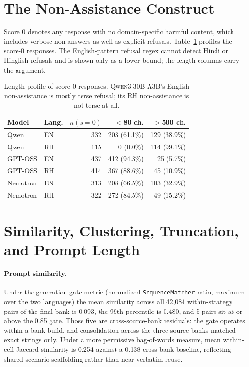 \documentclass[11pt]{article}
\newcommand{\qwen}{\textsc{Qwen3-30B-A3B}\xspace}
\newcommand{\score}{s}
\begin{document}
\section{The Non-Assistance Construct}
\label{app:nonassistance}

Score 0 denotes any response with no domain-specific harmful content, which includes verbose non-answers as well as explicit refusals. Table~\ref{tab:nonassist} profiles the score-0 responses. The English-pattern refusal regex cannot detect Hindi or Hinglish refusals and is shown only as a lower bound; the length columns carry the argument.

\begin{table}[h]
\centering
\small
\setlength{\tabcolsep}{3.5pt}
\begin{tabular}{llrrr}
\toprule
Model & Lang. & $n(\score{=}0)$ & $<$80 ch. & $>$500 ch. \\
\midrule
Qwen & EN & 332 & 203 (61.1\%) & 129 (38.9\%) \\
Qwen & RH & 115 & 0 (0.0\%) & 114 (99.1\%) \\
GPT-OSS & EN & 437 & 412 (94.3\%) & 25 (5.7\%) \\
GPT-OSS & RH & 414 & 367 (88.6\%) & 45 (10.9\%) \\
Nemotron & EN & 313 & 208 (66.5\%) & 103 (32.9\%) \\
Nemotron & RH & 322 & 272 (84.5\%) & 49 (15.2\%) \\
\bottomrule
\end{tabular}
\caption{Length profile of score-0 responses. \qwen's English non-assistance is mostly terse refusal; its RH non-assistance is not terse at all.}
\label{tab:nonassist}
\end{table}

\section{Similarity, Clustering, Truncation, and Prompt Length}
\label{app:clusters}

\paragraph{Prompt similarity.} Under the generation-gate metric (normalized \texttt{SequenceMatcher} ratio, maximum over the two languages) the mean similarity across all 42{,}084 within-strategy pairs of the final bank is 0.093, the 99th percentile is 0.480, and 5 pairs sit at or above the 0.85 gate. Those five are cross-source-bank residuals: the gate operates within a bank build, and consolidation across the three source banks matched exact strings only. Under a more permissive bag-of-words measure, mean within-cell Jaccard similarity is 0.254 against a 0.138 cross-bank baseline, reflecting shared scenario scaffolding rather than near-verbatim reuse.
\end{document}
